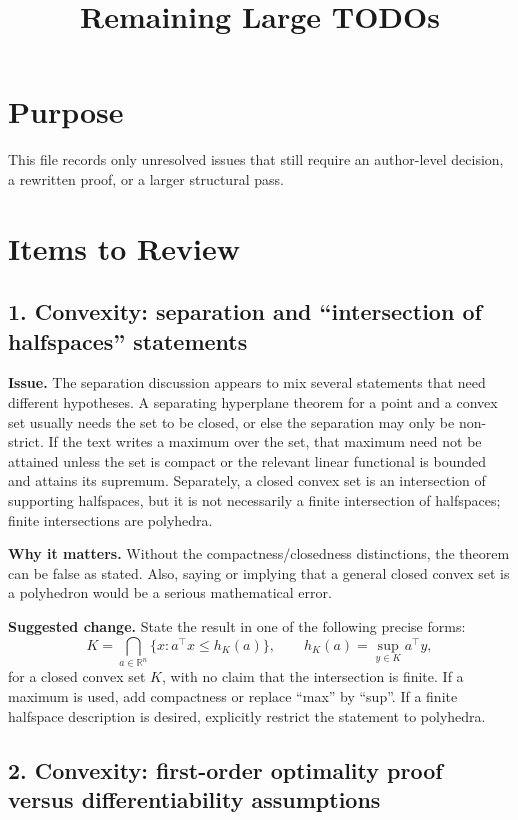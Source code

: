 \documentclass[11pt]{article}
\title{Remaining Large TODOs}
\author{}
\date{}
\begin{document}
\maketitle

\section*{Purpose}

This file records only unresolved issues that still require an author-level decision, a rewritten proof, or a larger structural pass.

\section*{Items to Review}

\subsection*{1. Convexity: separation and ``intersection of halfspaces'' statements}

\textbf{Issue.}  The separation discussion appears to mix several statements that need different hypotheses.  A separating hyperplane theorem for a point and a convex set usually needs the set to be closed, or else the separation may only be non-strict.  If the text writes a maximum over the set, that maximum need not be attained unless the set is compact or the relevant linear functional is bounded and attains its supremum.  Separately, a closed convex set is an intersection of supporting halfspaces, but it is not necessarily a finite intersection of halfspaces; finite intersections are polyhedra.

\textbf{Why it matters.}  Without the compactness/closedness distinctions, the theorem can be false as stated.  Also, saying or implying that a general closed convex set is a polyhedron would be a serious mathematical error.

\textbf{Suggested change.}  State the result in one of the following precise forms:
\[
K=\bigcap_{a\in\mathbb R^n}\{x:a^\top x\le h_K(a)\},
\qquad
h_K(a)=\sup_{y\in K}a^\top y,
\]
for a closed convex set \(K\), with no claim that the intersection is finite.  If a maximum is used, add compactness or replace ``max'' by ``sup''.  If a finite halfspace description is desired, explicitly restrict the statement to polyhedra.

\subsection*{2. Convexity: first-order optimality proof versus differentiability assumptions}
\end{document}
